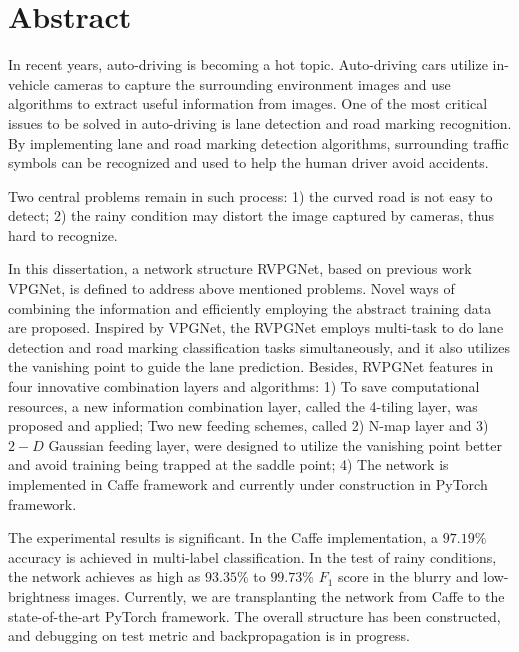 \newpage
\chapter*{\centering Abstract}
\begin{spacing}{1.5}
\setlength{\parskip}{0.3in}

In recent years, auto-driving is becoming a hot topic. Auto-driving cars utilize in-vehicle cameras to capture the surrounding environment images and use algorithms to extract useful information from images. One of the most critical issues to be solved in auto-driving is lane detection and road marking recognition. By implementing lane and road marking detection algorithms, surrounding traffic symbols can be recognized and used to help the human driver avoid accidents. 

Two central problems remain in such process: 1) the curved road is not easy to detect; 2) the rainy condition may distort the image captured by cameras, thus hard to recognize.

In this dissertation, a network structure RVPGNet, based on previous work VPGNet, is defined to address above mentioned problems. Novel ways of combining the information and efficiently employing the abstract training data are proposed. Inspired by VPGNet, the RVPGNet employs multi-task to do lane detection and road marking classification tasks simultaneously, and it also utilizes the vanishing point to guide the lane prediction. Besides, RVPGNet features in four innovative combination layers and algorithms: 1) To save computational resources, a new information combination layer, called the 4-tiling layer, was proposed and applied; Two new feeding schemes, called 2) N-map layer and 3) $2-D$ Gaussian feeding layer, were designed to utilize the vanishing point better and avoid training being trapped at the saddle point; 4) The network is implemented in Caffe framework and currently under construction in PyTorch framework. 

The experimental results is significant. In the Caffe implementation, a $97.19\%$ accuracy is achieved in multi-label classification. In the test of rainy conditions, the network achieves as high as $93.35\%$ to $99.73\%$ $F_1$ score in the blurry and low-brightness images. Currently, we are transplanting the network from Caffe to the state-of-the-art PyTorch framework. The overall structure has been constructed, and debugging on test metric and backpropagation is in progress.


\end{spacing}
